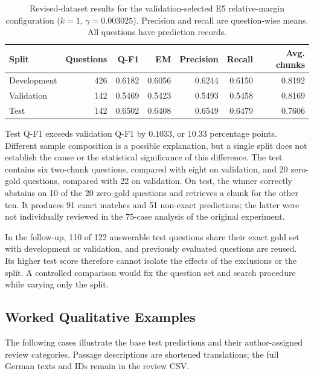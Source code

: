 \documentclass[11pt]{article}
\begin{document}
\begin{table}[t]
\centering

\small
\begin{tabular}{lrrrrrr}
\toprule
\textbf{Split} & \textbf{Questions} & \textbf{Q-F1} & \textbf{EM} & \textbf{Precision} & \textbf{Recall} & \textbf{Avg. chunks} \\
\midrule
Development & 426 & 0.6182 & 0.6056 & 0.6244 & 0.6150 & 0.8192 \\
Validation & 142 & 0.5469 & 0.5423 & 0.5493 & 0.5458 & 0.8169 \\
Test & 142 & 0.6502 & 0.6408 & 0.6549 & 0.6479 & 0.7606 \\
\bottomrule
\end{tabular}
\caption{Revised-dataset results for the validation-selected E5 relative-margin configuration ($k=1$, $\gamma=0.003025$). Precision and recall are question-wise means. All questions have prediction records.}
\label{tab:follow-up}
\end{table}

Test Q-F1 exceeds validation Q-F1 by $0.1033$, or 10.33 percentage points. Different sample composition is a possible explanation, but a single split does not establish the cause or the statistical significance of this difference. The test contains six two-chunk questions, compared with eight on validation, and 20 zero-gold questions, compared with 22 on validation. On test, the winner correctly abstains on 10 of the 20 zero-gold questions and retrieves a chunk for the other ten. It produces 91 exact matches and 51 non-exact predictions; the latter were not individually reviewed in the 75-case analysis of the original experiment.

In the follow-up, 110 of 122 answerable test questions share their exact gold set with development or validation, and previously evaluated questions are reused. Its higher test score therefore cannot isolate the effects of the exclusions or the split. A controlled comparison would fix the question set and search procedure while varying only the split.

\subsection{Worked Qualitative Examples}
\label{sec:examples}

The following cases illustrate the base test predictions and their author-assigned review categories. Passage descriptions are shortened translations; the full German texts and IDs remain in the review CSV.
\end{document}
